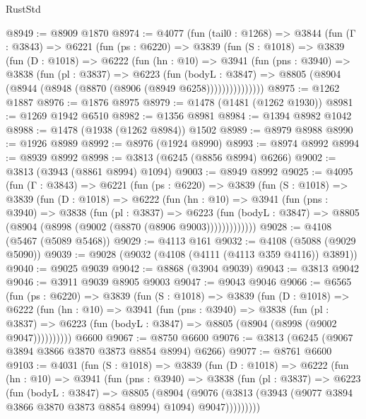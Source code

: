 \begin{lexlean}{RustStd}
\begin{coremodule}
{\begin{coremodule}
{{{{{{{{{{{{{{{{{{{{{{{{{{{{{{{{{{{@8949 := @8909 @1870
@8974 := @4077
    (fun (tail0 : @1268) =>
    @3844
      (fun (Γ : @3843) =>
      @6221
        (fun (ps : @6220) =>
        @3839
          (fun (S : @1018) =>
          @3839
            (fun (D : @1018) =>
            @6222
              (fun (hn : @10) =>
              @3941
                (fun (pns : @3940) =>
                @3838
                  (fun (pl : @3837) =>
                  @6223
                    (fun (bodyL : @3847) =>
                    @8805 (@8904 (@8944 (@8948 (@8870 (@8906 (@8949 @6258)))))))))))))))
@8975 := @1262 @1887
@8976 := @1876 @8975
@8979 := @1478 (@1481 (@1262 @1930))
@8981 := @1269 @1942 @6510
@8982 := @1356 @8981
@8984 := @1394 @8982 @1042
@8988 := @1478 (@1938 (@1262 @8984)) @1502
@8989 := @8979 @8988
@8990 := @1926 @8989
@8992 := @8976 (@1924 @8990)
@8993 := @8974 @8992
@8994 := @8939 @8992
@8998 := @3813 (@6245 (@8856 @8994) @6266)
@9002 := @3813 (@3943 (@8861 @8994) @1094)
@9003 := @8949 @8992
@9025 := @4095
    (fun (Γ : @3843) =>
    @6221
      (fun (ps : @6220) =>
      @3839
        (fun (S : @1018) =>
        @3839
          (fun (D : @1018) =>
          @6222
            (fun (hn : @10) =>
            @3941
              (fun (pns : @3940) =>
              @3838
                (fun (pl : @3837) =>
                @6223
                  (fun (bodyL : @3847) =>
                  @8805 (@8904 (@8998 (@9002 (@8870 (@8906 @9003)))))))))))))
@9028 := @4108 (@5467 (@5089 @5468))
@9029 := @4113 @161
@9032 := @4108 (@5088 (@9029 @5090))
@9039 := @9028 (@9032 (@4108 (@4111 (@4113 @359 @4116)) @3891))
@9040 := @9025 @9039
@9042 := @8868 (@3904 @9039)
@9043 := @3813 @9042
@9046 := @3911 @9039 @8905 @9003
@9047 := @9043 @9046
@9066 := @6565
    (fun (ps : @6220) =>
    @3839
      (fun (S : @1018) =>
      @3839
        (fun (D : @1018) =>
        @6222
          (fun (hn : @10) =>
          @3941
            (fun (pns : @3940) =>
            @3838
              (fun (pl : @3837) =>
              @6223 (fun (bodyL : @3847) => @8805 (@8904 (@8998 (@9002 @9047))))))))))
    @6600
@9067 := @8750 @6600
@9076 := @3813 (@6245 (@9067 @3894 @3866 @3870 @3873 @8854 @8994) @6266)
@9077 := @8761 @6600
@9103 := @4031
    (fun (S : @1018) =>
    @3839
      (fun (D : @1018) =>
      @6222
        (fun (hn : @10) =>
        @3941
          (fun (pns : @3940) =>
          @3838
            (fun (pl : @3837) =>
            @6223
              (fun (bodyL : @3847) =>
              @8805
                (@8904
                  (@9076
                    (@3813 (@3943 (@9077 @3894 @3866 @3870 @3873 @8854 @8994) @1094) @9047)))))))))
}}}}}}}}}}}}}}}}}}}}}}}}}}}}}}}}}}}
\end{coremodule}}
\end{coremodule}
\end{lexlean}
